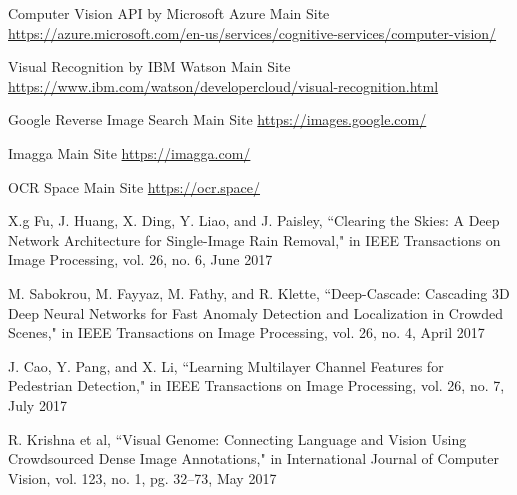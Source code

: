 %
%
%
\begin{thebibliography}{1}

Computer Vision API by Microsoft Azure Main Site \url{https://azure.microsoft.com/en-us/services/cognitive-services/computer-vision/}

Visual Recognition by IBM Watson Main Site \url{https://www.ibm.com/watson/developercloud/visual-recognition.html}

Google Reverse Image Search Main Site \url{https://images.google.com/}

Imagga Main Site \url{https://imagga.com/}

OCR Space Main Site \url{https://ocr.space/}

X.g Fu, J. Huang, X. Ding, Y. Liao, and J. Paisley, ``Clearing the Skies: A Deep Network Architecture for Single-Image Rain Removal," in IEEE Transactions on Image Processing, vol. 26, no. 6, June 2017

M. Sabokrou, M. Fayyaz, M. Fathy, and R. Klette, ``Deep-Cascade: Cascading 3D Deep Neural Networks for Fast Anomaly Detection and Localization in Crowded Scenes," in IEEE Transactions on Image Processing, vol. 26, no. 4, April 2017

J. Cao, Y. Pang, and X. Li, ``Learning Multilayer Channel Features for Pedestrian Detection," in IEEE Transactions on Image Processing, vol. 26, no. 7, July 2017



R. Krishna et al, ``Visual Genome: Connecting Language and Vision Using Crowdsourced Dense Image Annotations," in International Journal of Computer Vision, vol. 123, no. 1, pg. 32--73, May 2017



\end{thebibliography}

